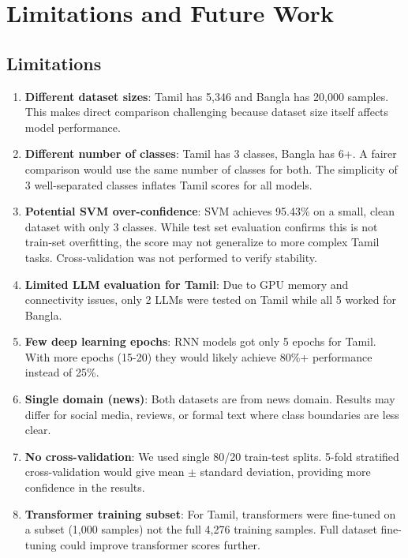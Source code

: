 \documentclass[conference]{IEEEtran}
\begin{document}
\section{Limitations and Future Work}

\subsection{Limitations}

\begin{enumerate}
\item \textbf{Different dataset sizes}: Tamil has 5,346 and Bangla has 20,000 samples. This makes direct comparison challenging because dataset size itself affects model performance.

\item \textbf{Different number of classes}: Tamil has 3 classes, Bangla has 6+. A fairer comparison would use the same number of classes for both. The simplicity of 3 well-separated classes inflates Tamil scores for all models.

\item \textbf{Potential SVM over-confidence}: SVM achieves 95.43\% on a small, clean dataset with only 3 classes. While test set evaluation confirms this is not train-set overfitting, the score may not generalize to more complex Tamil tasks. Cross-validation was not performed to verify stability.

\item \textbf{Limited LLM evaluation for Tamil}: Due to GPU memory and connectivity issues, only 2 LLMs were tested on Tamil while all 5 worked for Bangla.

\item \textbf{Few deep learning epochs}: RNN models got only 5 epochs for Tamil. With more epochs (15-20) they would likely achieve 80\%+ performance instead of 25\%.

\item \textbf{Single domain (news)}: Both datasets are from news domain. Results may differ for social media, reviews, or formal text where class boundaries are less clear.

\item \textbf{No cross-validation}: We used single 80/20 train-test splits. 5-fold stratified cross-validation would give mean $\pm$ standard deviation, providing more confidence in the results.

\item \textbf{Transformer training subset}: For Tamil, transformers were fine-tuned on a subset (1,000 samples) not the full 4,276 training samples. Full dataset fine-tuning could improve transformer scores further.


\end{enumerate}
\end{document}
